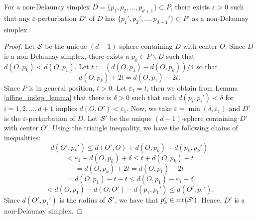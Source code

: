 \documentclass[letterpaper,titlepage]{article}
\begin{document}
    \begin{lem}\label{stay-non-delaunay}
        For a non-Delaunay simplex $D= \{p_1,p_2,\dots,p_{d+1}\} \subset P$, there exists $\varepsilon>0$ such that any $\varepsilon$-perturbation $D'$ of $D$ has $\{p_1',p_2',\dots,p_{d+1}'\} \subset P'$ as a non-Delaunay simplex.
    \end{lem}
    \begin{proof}
        Let $\mathcal{S}$ be the unique $(d-1)$-sphere containing $D$ with center $O$. Since $D$ is a non-Delaunay simplex, there exists a $p_k \in P\backslash D$ such that $d(O,p_k) < d(O,p_1)$. Let $t:=(d(O,p_1)-d(O,p_k))/4$ so that 
        $$d(O,p_k)+2t = d(O,p_1)-2t.$$
        Since $P$ is in general position, $t > 0$. Let $\varepsilon_1 = t$, then we obtain from Lemma \ref{affine_indep_lemma} that there is $\delta>0$ such that each $d(p_i,p_i')<\delta$ for $i=1,2,\dots,d+1$ implies $d(O,O')<\varepsilon_1$. Now, we take $\varepsilon = \min(\delta, \varepsilon_1)$ and $D'$ is the $\varepsilon$-perturbation of $D$. Let $\mathcal{S}'$ be the unique $(d-1)$-sphere containing $D'$ with center $O'$. Using the triangle inequality, we have the following chains of inequalities:
        $$d(O',p_k') \leq d(O',O)+d(O,p_k)+d(p_k,p_k') $$
        $$< \varepsilon_1 + d(O,p_k)+\delta \leq t+d(O,p_k)+t$$
        $$=d(O,p_k)+2t= d(O,p_1)-2t$$
        $$=d(O,p_1)-t-t \leq d(O,p_1)-\varepsilon_1-\delta$$
        $$< d(O,p_1)-d(O,O')-d(p_1,p_1') \leq d(O',p_1').$$
        Since $d(O',p_1')$ is the radius of $\mathcal{S}'$, we have that $p_k' \in \text{int}(\mathcal{S}')$. Hence, $D'$ is a non-Delaunay simplex.
    \end{proof}    
    
\end{document}
